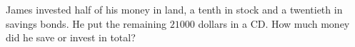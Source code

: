James invested half of his money in land, a tenth in stock and a twentieth in savings bonds. He put the remaining $21000$ dollars in a CD. How much money did he save or invest in total?

